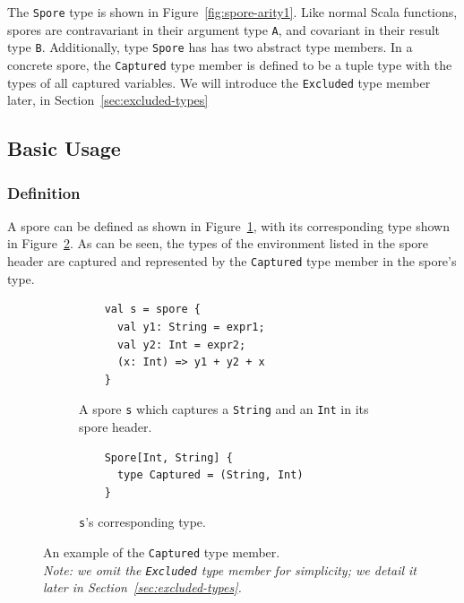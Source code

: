 \documentclass{llncs}
\begin{document}
The \verb|Spore| type is shown in Figure~\ref{fig:spore-arity1}. Like normal
Scala functions, spores are contravariant in their argument type \verb|A|, and
covariant in their result type \verb|B|. Additionally, type \verb|Spore| has
has two abstract type members. In a concrete spore, the \verb|Captured| type
member is defined to be a tuple type with the types of all captured variables.
We will introduce the \verb|Excluded| type member later, in Section~\ref{sec:excluded-types}

\vspace{2mm}
\subsection{Basic Usage}
\label{sec:basic-usage}
\vspace{1mm}


\subsubsection{Definition}

A spore can be defined as shown in Figure~\ref{fig:captured-spore}, with its
corresponding type shown in Figure~\ref{fig:captured-type}. As can be seen,
the types of the environment listed in the spore header are captured and
represented by the \verb|Captured| type member in the spore's type.

\begin{figure}[t!]
\begin{subfigure}{.5\textwidth}
  \centering
  \begin{lstlisting}
    val s = spore {
      val y1: String = expr1;
      val y2: Int = expr2;
      (x: Int) => y1 + y2 + x
    }
  \end{lstlisting}
  \caption{A spore \texttt{s} which captures a \texttt{String} and an \texttt{Int} in its spore header.}
  \label{fig:captured-spore}
\end{subfigure}%
\begin{subfigure}{.5\textwidth}
  \centering
  \begin{lstlisting}
    Spore[Int, String] {
      type Captured = (String, Int)
    }
  \end{lstlisting}
  \caption{\texttt{s}'s corresponding type.}
  \label{fig:captured-type}
\end{subfigure}%
\vspace{1mm}
\caption{An example of the \texttt{Captured} type member. \\\textit{Note: we omit the
\texttt{Excluded} type member for simplicity; we detail it later in Section~\ref{sec:excluded-types}.}}
\label{fig:captured-ex}
\vspace{-5mm}
\end{figure}
\end{document}
